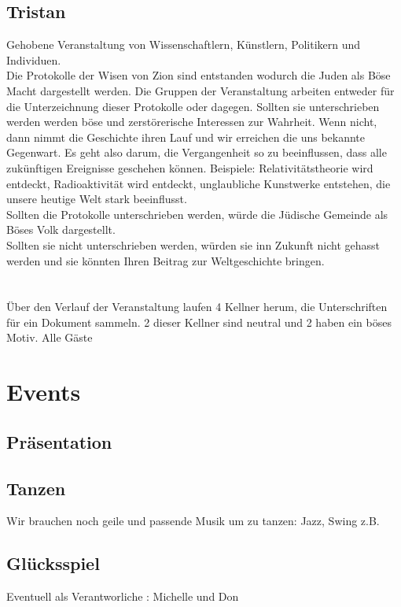 \documentclass[12pt, a4paper, openany]{report}
\begin{document}
\section{Tristan}
Gehobene Veranstaltung von Wissenschaftlern, Künstlern, Politikern und Individuen.\\
Die Protokolle der Wisen von Zion sind entstanden wodurch die Juden als Böse Macht dargestellt werden. 
Die Gruppen der Veranstaltung arbeiten entweder für die Unterzeichnung dieser Protokolle oder dagegen.
Sollten sie unterschrieben werden werden böse und zerstörerische Interessen zur Wahrheit.
Wenn nicht, dann nimmt die Geschichte ihren Lauf und wir erreichen die uns bekannte Gegenwart.
Es geht also darum, die Vergangenheit so zu beeinflussen, dass alle zukünftigen Ereignisse geschehen können.
Beispiele: Relativitätstheorie wird entdeckt, Radioaktivität wird entdeckt, unglaubliche Kunstwerke entstehen, die unsere heutige Welt stark beeinflusst.\\
Sollten die Protokolle unterschrieben werden, würde die Jüdische Gemeinde als Böses Volk dargestellt.\\
Sollten sie nicht unterschrieben werden, würden sie inn Zukunft nicht gehasst werden und sie könnten Ihren Beitrag zur Weltgeschichte bringen.\\\\\\
Über den Verlauf der Veranstaltung laufen 4 Kellner herum, die Unterschriften für ein Dokument sammeln. 2 dieser Kellner sind neutral und 2 haben ein böses Motiv.
Alle Gäste


\chapter{Events}
\section{Präsentation}
\section{Tanzen}
Wir brauchen noch geile und passende Musik um zu tanzen:
Jazz, Swing z.B.

\section{Glücksspiel}
Eventuell als Verantworliche : Michelle und Don
\end{document}
